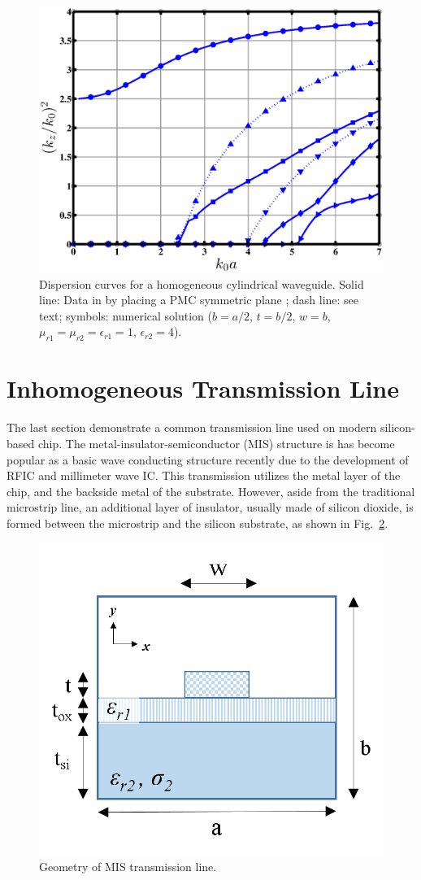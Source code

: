 \documentclass{pj}
\begin{document}
\begin{figure}[htbp]
	\centering
	\includegraphics[width=\defaultfigurewidth]{./img/rectangular_inhomo_strip/dispersion.eps}
	\caption{Dispersion curves for a homogeneous cylindrical waveguide. Solid line: Data in \cite{na_JinJM_JinJM_2014_finite_element} \ifdisplayspuriousmodestrip by placing a PMC symmetric plane \fi; \ifdisplayspuriousmodestrip dash line: see text; \fi symbols: numerical solution ($b=a/2$, $t=b/2$, $w=b$, $\mu_{r1}=\mu_{r2}=\epsilon_{r1} = 1$, $\epsilon_{r2} = 4$).}
	\label{fig:rect_inhomo_strip_dispersion}
\end{figure}


\section{Inhomogeneous Transmission Line}
The last section demonstrate a common transmission line used on modern silicon-based chip. The metal-insulator-semiconductor (MIS) structure is has become popular as a basic wave conducting structure recently due to the development of RFIC and millimeter wave IC. This transmission utilizes the metal layer of the chip, and the backside metal of the substrate. However, aside from the traditional microstrip line, an additional layer of insulator, usually made of silicon dioxide, is formed between the microstrip and the silicon substrate, as shown in Fig.~\ref{fig:mis_geom}.\\

\begin{figure}[htbp]
	\centering
	\includegraphics[width=0.5\columnwidth]{./img/mis/geometry.png}
	\caption{Geometry of MIS transmission line. }
	\label{fig:mis_geom}
\end{figure}
\end{document}
